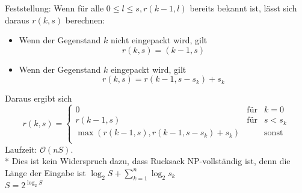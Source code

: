 \documentclass[a4paper]{scrartcl}
\begin{document}
Feststellung: Wenn für alle $0 \leq l \leq s, r(k-1,l)$ bereits bekannt ist, lässt sich daraus $r(k,s)$ berechnen:
\begin{itemize}
\item Wenn der Gegenstand $k$ nicht eingepackt wird, gilt
\[ r(k,s) = (k-1,s) \]
\item Wenn der Gegenstand $k$ eingepackt wird, gilt
\[ r(k,s) = r(k-1,s-s_k) + s_k \]
\end{itemize}
Daraus ergibt sich
\[ r(k,s) = \left \{ \begin{array}{lcr} 0 & \text{für} & k= 0 \\ r(k-1,s) & \text{für} & s < s_k\\ \max{(r(k-1,s),r(k-1,s-s_k)+s_k)} & & \text{sonst}\\ \end{array} \right. \]
Laufzeit: $\mathcal{O}(nS)$.\\*
Dies ist kein Widerspruch dazu, dass Rucksack \textsc{NP}-vollständig ist, denn die Länge der Eingabe ist $\log_2{S} + \sum\limits_{k=1}^{n} \log_2{s_k}$\\
$S= 2^{\log_2{S}}$
\end{document}
